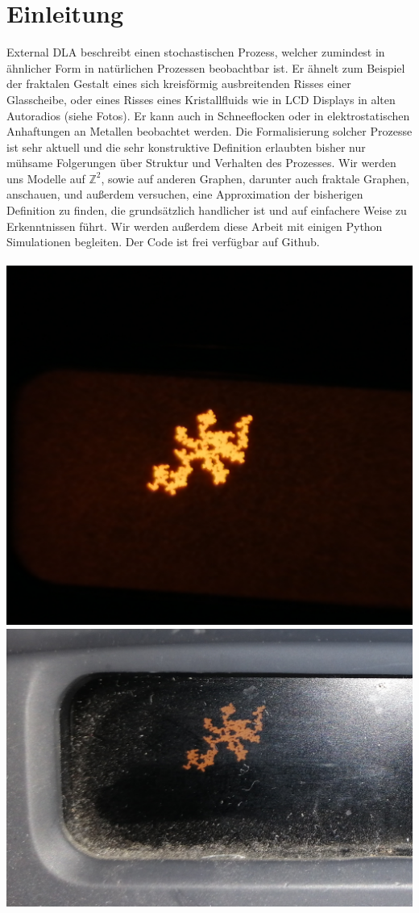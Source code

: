 \documentclass[12pt,a4paper]{scrartcl}
\numberwithin{equation}{section}
\numberwithin{equation}{section}
\theoremstyle{definition}
\begin{document}
\section{Einleitung}
External DLA beschreibt einen stochastischen Prozess, welcher zumindest in ähnlicher Form in natürlichen Prozessen beobachtbar ist. Er ähnelt zum Beispiel der fraktalen Gestalt eines sich kreisförmig ausbreitenden Risses einer Glasscheibe, oder eines Risses eines Kristallfluids wie in LCD Displays in alten Autoradios (siehe Fotos). Er kann auch in Schneeflocken oder in elektrostatischen Anhaftungen an Metallen beobachtet werden. Die Formalisierung solcher Prozesse ist sehr aktuell und die sehr konstruktive Definition erlaubten bisher nur mühsame Folgerungen über Struktur und Verhalten des Prozesses. Wir werden uns Modelle auf $\mathbb{Z}^2$, sowie auf anderen Graphen, darunter auch fraktale Graphen, anschauen, und außerdem versuchen, eine Approximation der bisherigen Definition zu finden, die grundsätzlich handlicher ist und auf einfachere Weise zu Erkenntnissen führt. Wir werden außerdem diese Arbeit mit einigen Python Simulationen begleiten. Der Code ist frei verfügbar auf Github. \\
\\

\includegraphics[scale=0.04]{display.jpg} 
\includegraphics[scale=0.091]{display2.jpg} 
\end{document}
